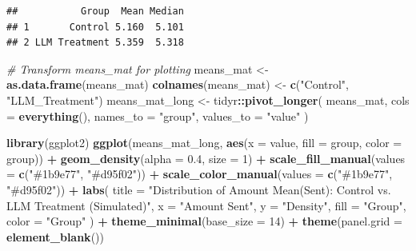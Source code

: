 \documentclass[
]{article}
\newenvironment{Shaded}{\begin{snugshade}}{\end{snugshade}}
\newcommand{\AttributeTok}[1]{\textcolor[rgb]{0.13,0.29,0.53}{#1}}
\newcommand{\CommentTok}[1]{\textcolor[rgb]{0.56,0.35,0.01}{\textit{#1}}}
\newcommand{\DecValTok}[1]{\textcolor[rgb]{0.00,0.00,0.81}{#1}}
\newcommand{\FloatTok}[1]{\textcolor[rgb]{0.00,0.00,0.81}{#1}}
\newcommand{\FunctionTok}[1]{\textcolor[rgb]{0.13,0.29,0.53}{\textbf{#1}}}
\newcommand{\NormalTok}[1]{#1}
\newcommand{\OtherTok}[1]{\textcolor[rgb]{0.56,0.35,0.01}{#1}}
\newcommand{\SpecialCharTok}[1]{\textcolor[rgb]{0.81,0.36,0.00}{\textbf{#1}}}
\newcommand{\StringTok}[1]{\textcolor[rgb]{0.31,0.60,0.02}{#1}}
\begin{document}
\begin{verbatim}
##           Group  Mean Median
## 1       Control 5.160  5.101
## 2 LLM Treatment 5.359  5.318
\end{verbatim}

\begin{Shaded}
\begin{Highlighting}[]
\CommentTok{\# Transform means\_mat for plotting}
\NormalTok{means\_mat }\OtherTok{\textless{}{-}} \FunctionTok{as.data.frame}\NormalTok{(means\_mat)}
\FunctionTok{colnames}\NormalTok{(means\_mat) }\OtherTok{\textless{}{-}} \FunctionTok{c}\NormalTok{(}\StringTok{"Control"}\NormalTok{, }\StringTok{"LLM\_Treatment"}\NormalTok{)}
\NormalTok{means\_mat\_long }\OtherTok{\textless{}{-}}\NormalTok{ tidyr}\SpecialCharTok{::}\FunctionTok{pivot\_longer}\NormalTok{(}
\NormalTok{  means\_mat,}
  \AttributeTok{cols =} \FunctionTok{everything}\NormalTok{(),}
  \AttributeTok{names\_to =} \StringTok{"group"}\NormalTok{,}
  \AttributeTok{values\_to =} \StringTok{"value"}
\NormalTok{)}

\FunctionTok{library}\NormalTok{(ggplot2)}
\FunctionTok{ggplot}\NormalTok{(means\_mat\_long, }\FunctionTok{aes}\NormalTok{(}\AttributeTok{x =}\NormalTok{ value, }\AttributeTok{fill =}\NormalTok{ group, }\AttributeTok{color =}\NormalTok{ group)) }\SpecialCharTok{+}
  \FunctionTok{geom\_density}\NormalTok{(}\AttributeTok{alpha =} \FloatTok{0.4}\NormalTok{, }\AttributeTok{size =} \DecValTok{1}\NormalTok{) }\SpecialCharTok{+}
  \FunctionTok{scale\_fill\_manual}\NormalTok{(}\AttributeTok{values =} \FunctionTok{c}\NormalTok{(}\StringTok{"\#1b9e77"}\NormalTok{, }\StringTok{"\#d95f02"}\NormalTok{)) }\SpecialCharTok{+}
  \FunctionTok{scale\_color\_manual}\NormalTok{(}\AttributeTok{values =} \FunctionTok{c}\NormalTok{(}\StringTok{"\#1b9e77"}\NormalTok{, }\StringTok{"\#d95f02"}\NormalTok{)) }\SpecialCharTok{+}
  \FunctionTok{labs}\NormalTok{(}
  \AttributeTok{title =} \StringTok{"Distribution of Amount Mean(Sent): Control vs. LLM Treatment (Simulated)"}\NormalTok{,}
  \AttributeTok{x =} \StringTok{"Amount Sent"}\NormalTok{,}
  \AttributeTok{y =} \StringTok{"Density"}\NormalTok{,}
  \AttributeTok{fill =} \StringTok{"Group"}\NormalTok{,}
  \AttributeTok{color =} \StringTok{"Group"}
\NormalTok{  ) }\SpecialCharTok{+}
  \FunctionTok{theme\_minimal}\NormalTok{(}\AttributeTok{base\_size =} \DecValTok{14}\NormalTok{) }\SpecialCharTok{+}
  \FunctionTok{theme}\NormalTok{(}\AttributeTok{panel.grid =} \FunctionTok{element\_blank}\NormalTok{())}
\end{Highlighting}
\end{Shaded}
\end{document}
